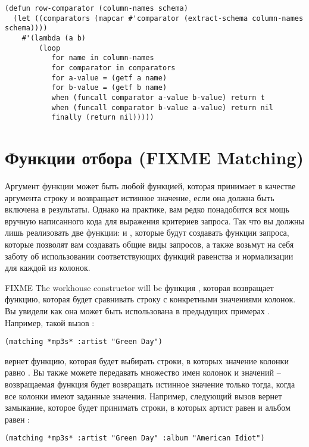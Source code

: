 \begin{lstlisting}
(defun row-comparator (column-names schema)
  (let ((comparators (mapcar #'comparator (extract-schema column-names schema))))
    #'(lambda (a b)
        (loop
           for name in column-names
           for comparator in comparators
           for a-value = (getf a name)
           for b-value = (getf b name)
           when (funcall comparator a-value b-value) return t
           when (funcall comparator b-value a-value) return nil
           finally (return nil)))))
\end{lstlisting}

\section{Функции отбора (FIXME Matching)}

Аргумент  функции  может быть любой функцией, которая принимает
в качестве аргумента строку и возвращает истинное значение, если она должна быть включена
в результаты.  Однако на практике, вам редко понадобится вся мощь вручную написанного кода
для выражения критериев запроса.  Так что вы должны лишь реализовать две функции:
 и , которые будут создавать функции запроса, которые позволят вам
создавать общие виды запросов, а также возьмут на себя заботу об использовании
соответствующих функций равенства и нормализации для каждой из колонок.

FIXME The workhouse  constructor will be функция ,
которая возвращает функцию, которая будет сравнивать строку с конкретными значениями
колонок.  Вы увидели как она может быть использована в предыдущих примерах .
Например, такой вызов :

\begin{lstlisting}
(matching *mp3s* :artist "Green Day")
\end{lstlisting}

вернет функцию, которая будет выбирать строки, в которых значение колонки 
равно .  Вы также можете передавать множество имен колонок и значений --
возвращаемая функция будет возвращать истинное значение только тогда, когда все колонки
имеют заданные значения.  Например, следующий вызов вернет замыкание, которое будет
принимать строки, в которых артист равен  и альбом равен :

\begin{lstlisting}
(matching *mp3s* :artist "Green Day" :album "American Idiot")
\end{lstlisting}

